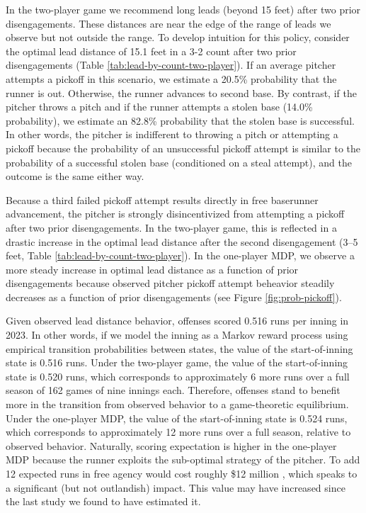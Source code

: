 \documentclass[11pt]{article}
\begin{document}
    In the two-player game we recommend long leads (beyond 15 feet) after two prior disengagements. These distances are near the edge of the range of leads we observe but not outside the range. To develop intuition for this policy, consider the optimal lead distance of 15.1 feet in a 3-2 count after two prior disengagements (Table \ref{tab:lead-by-count-two-player}). If an average pitcher attempts a pickoff in this scenario, we estimate a 20.5\% probability that the runner is out. Otherwise, the runner advances to second base. By contrast, if the pitcher throws a pitch and if the runner attempts a stolen base (14.0\% probability), we estimate an 82.8\% probability that the stolen base is successful. In other words, the pitcher is indifferent to throwing a pitch or attempting a pickoff because the probability of an unsuccessful pickoff attempt is similar to the probability of a successful stolen base (conditioned on a steal attempt), and the outcome is the same either way.

    Because a third failed pickoff attempt results directly in free baserunner advancement, the pitcher is strongly disincentivized from attempting a pickoff after two prior disengagements. In the two-player game, this is reflected in a drastic increase in the optimal lead distance after the second disengagement (3--5 feet, Table \ref{tab:lead-by-count-two-player}). In the one-player MDP, we observe a more steady increase in optimal lead distance as a function of prior disengagements because observed pitcher pickoff attempt beheavior steadily decreases as a function of prior disengagements (see Figure \ref{fig:prob-pickoff}).

    Given observed lead distance behavior, offenses scored 0.516 runs per inning in 2023. In other words, if we model the inning as a Markov reward process using empirical transition probabilities between states, the value of the start-of-inning state is 0.516 runs. Under the two-player game, the value of the start-of-inning state is 0.520 runs, which corresponds to approximately 6 more runs over a full season of 162 games of nine innings each. Therefore, offenses stand to benefit more in the transition from observed behavior to a game-theoretic equilibrium. Under the one-player MDP, the value of the start-of-inning state is 0.524 runs, which corresponds to approximately 12 more runs over a full season, relative to observed behavior. Naturally, scoring expectation is higher in the one-player MDP because the runner exploits the sub-optimal strategy of the pitcher. To add 12 expected runs in free agency would cost roughly \$12 million \parencite{clemens_what_2021}, which speaks to a significant (but not outlandish) impact. This value may have increased since the last study we found to have estimated it.
\end{document}

